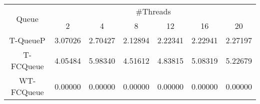 \begin{tabular}{|c|c|c|c|c|c|c|}
\hline
\multirow{2}{*}{Queue} & \multicolumn{6}{c|}{\#Threads}\\\cline{2-7}& 2 & 4 & 8 & 12 & 16 & 20\\
\hline
\hline
T-QueueP & 3.07026 & 2.70427 & 2.12894 & 2.22341 & 2.22941 & 2.27197\\
T-FCQueue & 4.05484 & 5.98340 & 4.51612 & 4.83815 & 5.08319 & 5.22679\\
WT-FCQueue & 0.00000 & 0.00000 & 0.00000 & 0.00000 & 0.00000 & 0.00000\\
\hline\end{tabular}
